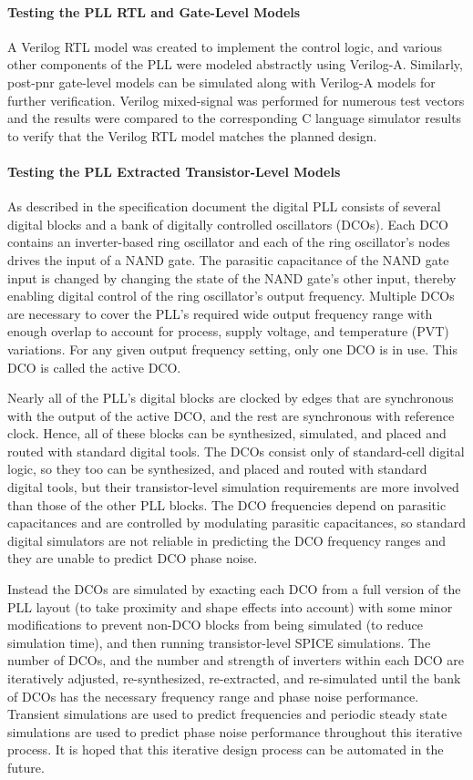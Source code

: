 \paragraph{Testing the PLL RTL and Gate-Level Models}
A Verilog RTL model was created to implement the control logic, and
various other components of the PLL were modeled abstractly using
Verilog-A. Similarly, post-pnr gate-level models can be simulated along
with Verilog-A models for further verification. Verilog mixed-signal was
performed for numerous test vectors and the results were compared to the
corresponding C language simulator results to verify that the Verilog RTL
model matches the planned design.

\paragraph{Testing the PLL Extracted Transistor-Level Models}
As described in the specification document the digital PLL consists of
several digital blocks and a bank of digitally controlled oscillators
(DCOs). Each DCO contains an inverter-based ring oscillator and each of
the ring oscillator's nodes drives the input of a NAND gate. The
parasitic capacitance of the NAND gate input is changed by changing the
state of the NAND gate's other input, thereby enabling digital control of
the ring oscillator's output frequency. Multiple DCOs are necessary to
cover the PLL's required wide output frequency range with enough overlap
to account for process, supply voltage, and temperature (PVT) variations.
For any given output frequency setting, only one DCO is in use. This DCO
is called the active DCO.

Nearly all of the PLL's digital blocks are clocked by edges that are
synchronous with the output of the active DCO, and the rest are
synchronous with reference clock. Hence, all of these blocks can be
synthesized, simulated, and placed and routed with standard digital
tools. The DCOs consist only of standard-cell digital logic, so they too
can be synthesized, and placed and routed with standard digital tools,
but their transistor-level simulation requirements are more involved than
those of the other PLL blocks. The DCO frequencies depend on parasitic
capacitances and are controlled by modulating parasitic capacitances, so
standard digital simulators are not reliable in predicting the DCO
frequency ranges and they are unable to predict DCO phase noise.

Instead the DCOs are simulated by exacting each DCO from a full version
of the PLL layout (to take proximity and shape effects into account) with
some minor modifications to prevent non-DCO blocks from being simulated
(to reduce simulation time), and then running transistor-level SPICE
simulations. The number of DCOs, and the number and strength of inverters
within each DCO are iteratively adjusted, re-synthesized, re-extracted,
and re-simulated until the bank of DCOs has the necessary frequency range
and phase noise performance. Transient simulations are used to predict
frequencies and periodic steady state simulations are used to predict
phase noise performance throughout this iterative process. It is hoped
that this iterative design process can be automated in the future.

